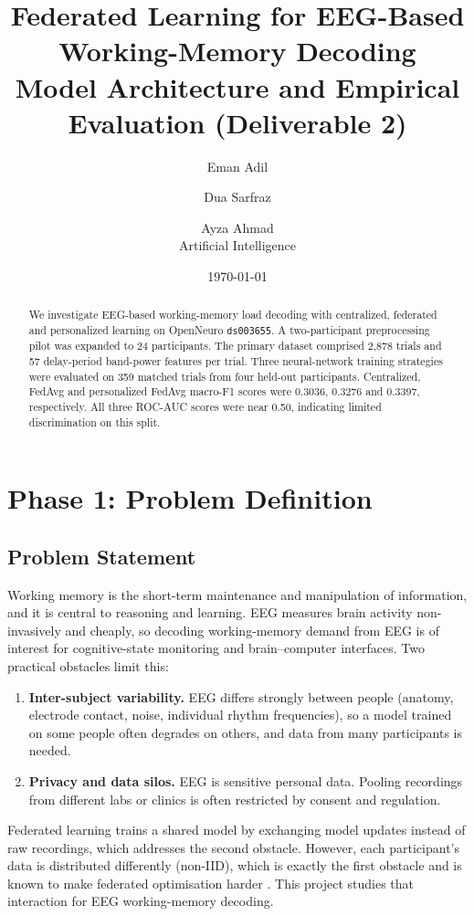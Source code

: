 \documentclass[11pt,a4paper]{article}
\title{Federated Learning for EEG-Based Working-Memory Decoding\\
\large Model Architecture and Empirical Evaluation (Deliverable 2)}
\author{Eman Adil \and Dua Sarfraz \and Ayza Ahmad\\[3pt] {Artificial Intelligence}}
\date{\today}
\begin{document}
\maketitle

\begin{abstract}
We investigate EEG-based working-memory load decoding with centralized,
federated and personalized learning on OpenNeuro \texttt{ds003655}.
A two-participant preprocessing pilot was expanded to 24 participants.
The primary dataset comprised 2,878 trials and 57 delay-period band-power
features per trial. Three neural-network training strategies were
evaluated on 359 matched trials from four held-out participants.
Centralized, FedAvg and personalized FedAvg macro-F1 scores were 0.3036,
0.3276 and 0.3397, respectively. All three ROC-AUC scores were near 0.50,
indicating limited discrimination on this split.
\end{abstract}

\tableofcontents
\newpage

\section{Phase 1: Problem Definition}

\subsection{Problem Statement}
Working memory is the short-term maintenance and manipulation of information, and it is central to reasoning and
learning. EEG measures brain activity non-invasively and cheaply, so decoding working-memory demand from EEG is of
interest for cognitive-state monitoring and brain--computer interfaces. Two practical obstacles limit this:
\begin{enumerate}[leftmargin=*]
  \item \textbf{Inter-subject variability.} EEG differs strongly between people (anatomy, electrode contact, noise,
  individual rhythm frequencies), so a model trained on some people often degrades on others, and data from many
  participants is needed.
  \item \textbf{Privacy and data silos.} EEG is sensitive personal data. Pooling recordings from different labs or
  clinics is often restricted by consent and regulation.
\end{enumerate}
Federated learning trains a shared model by exchanging model updates instead of raw recordings, which addresses the
second obstacle. However, each participant's data is distributed differently (non-IID), which is exactly the first
obstacle and is known to make federated optimisation harder \cite{mcmahan2017}. This project studies that
interaction for EEG working-memory decoding.
\end{document}

